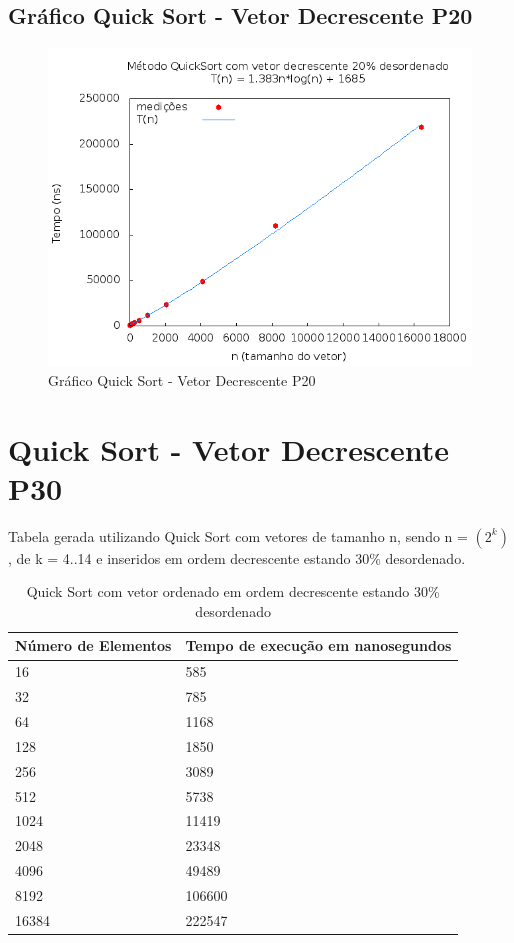 \documentclass[12pt,a4paper,twoside]{report}
\begin{document}
\subsection{Gráfico Quick Sort - Vetor Decrescente P20}
\begin{figure}[H]
    \centering
    \includegraphics[width=0.7\linewidth]{graficos/QuickSort/vIntDecrescenteP20/vIntDecrescenteP20.png}
  \caption{Gráfico Quick Sort - Vetor Decrescente P20}
\end{figure}

\section{Quick Sort - Vetor Decrescente P30}
Tabela gerada utilizando Quick Sort com vetores de tamanho n, sendo n = $(2^k)$, de k = 4..14 e inseridos em ordem decrescente estando 30\% desordenado.
\begin{table}[H]
\centering
\caption{Quick Sort com vetor ordenado em ordem decrescente estando 30\% desordenado}
\label{my-label}
\begin{tabular}{|l|l|}
\hline
\multicolumn{1}{|c|}{\textbf{Número de Elementos}} & \multicolumn{1}{c|}{\textbf{Tempo de execução em nanosegundos}} \\ \hline
16 & 585 \\ \hline
32 & 785 \\ \hline
64 & 1168 \\ \hline
128 & 1850 \\ \hline
256 & 3089 \\ \hline
512 & 5738 \\ \hline
1024 & 11419 \\ \hline
2048 & 23348 \\ \hline
4096 & 49489 \\ \hline
8192 & 106600 \\ \hline
16384 & 222547 \\ \hline
\end{tabular}
\end{table}
\end{document}
